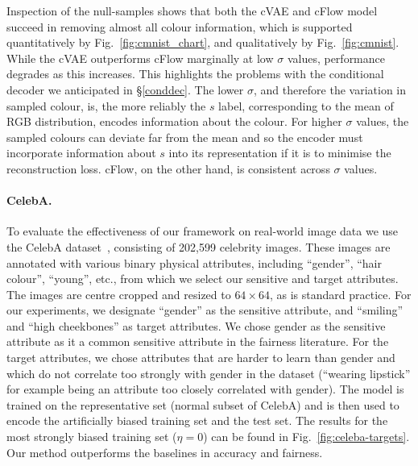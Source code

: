 Inspection of the null-samples shows that both the \ac{cVAE} and \ac{cFlow} model succeed in
removing almost all colour information, which is supported quantitatively by
Fig.~\ref{fig:cmnist_chart}, and qualitatively by Fig.~\ref{fig:cmnist}. 
%
While the \ac{cVAE} outperforms \ac{cFlow} marginally at low \(\sigma\) values, performance degrades
as this increases. 
%
This highlights the problems with the conditional decoder we anticipated in \S\ref{conddec}. 
%
The lower $\sigma$, and therefore the variation in sampled colour, is, the more reliably the $s$
label, corresponding to the mean of RGB distribution, encodes information about the colour. 
%
For higher $\sigma$ values, the sampled colours can deviate far from the mean and so the encoder
must incorporate information about $s$ into its representation if it is to minimise the
reconstruction loss. \ac{cFlow}, on the other hand, is consistent across $\sigma$ values.
%
\paragraph{CelebA.}
%
To evaluate the effectiveness of our framework on real-world image data we use the CelebA
dataset~\citep{liu2015faceattributes}, consisting of 202,599 celebrity images. 
%
These images are annotated with various binary physical  attributes, including ``gender'', ``hair
colour'', ``young'', etc., from which we select our sensitive and target attributes. 
%
The images are centre cropped and resized to $64\times64$, as is standard practice. 
%
For our experiments, we designate ``gender'' as the sensitive attribute, and ``smiling'' and ``high
cheekbones'' as target attributes. 
%
We chose gender as the sensitive attribute as it a common sensitive attribute in the fairness
literature. 
%
For the target attributes, we chose attributes that are harder to learn than gender and which do
not correlate too strongly with gender in the dataset (``wearing lipstick'' for example being an
attribute too closely correlated with gender).
%
The model is trained on the representative set (normal subset of CelebA) and is then used to encode
the artificially biased training set and the test set. The results for the most strongly biased
training set ($\eta=0$) can be found in Fig.~\ref{fig:celeba-targets}. Our method outperforms the
baselines in accuracy and fairness.

